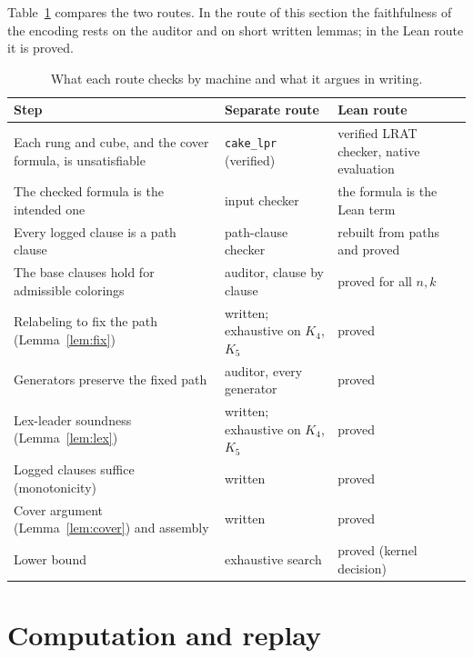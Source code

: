 Table~\ref{tab:status} compares the two routes. In the route of this
section the faithfulness of the encoding rests on the auditor and on short
written lemmas; in the Lean route it is proved.

\begin{table}[ht]
\centering
\small
\begin{tabular}{@{}>{\raggedright}p{}>{\raggedright}p{}>{\raggedright\arraybackslash}p{}@{}}
\toprule
Step & Separate route & Lean route\\
\midrule
Each rung and cube, and the cover formula, is unsatisfiable & \texttt{cake\_lpr} (verified) & verified LRAT checker, native evaluation\\
The checked formula is the intended one & input checker & the formula is the Lean term\\
Every logged clause is a path clause & path-clause checker & rebuilt from paths and proved\\
The base clauses hold for admissible colorings & auditor, clause by clause & proved for all $n,k$\\
Relabeling to fix the path (Lemma~\ref{lem:fix}) & written; exhaustive on $K_4$, $K_5$ & proved\\
Generators preserve the fixed path & auditor, every generator & proved\\
Lex-leader soundness (Lemma~\ref{lem:lex}) & written; exhaustive on $K_4$, $K_5$ & proved\\
Logged clauses suffice (monotonicity) & written & proved\\
Cover argument (Lemma~\ref{lem:cover}) and assembly & written & proved\\
Lower bound & exhaustive search & proved (kernel decision)\\
\bottomrule
\end{tabular}
\medskip
\caption{What each route checks by machine and what it argues in writing.}\label{tab:status}
\end{table}

\section{Computation and replay}\label{sec:replay}

